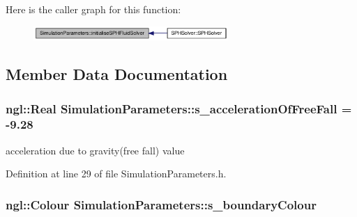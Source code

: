 Here is the caller graph for this function:\nopagebreak
\begin{figure}[H]
\begin{center}
\leavevmode
\includegraphics[width=209pt]{class_simulation_parameters_aa9389962f767734ad8f0ffc63cb0ed46_icgraph}
\end{center}
\end{figure}




\subsection{Member Data Documentation}
\hypertarget{class_simulation_parameters_a7e0162b56c6960d1aceb3a88ee3326e3}{
\subsubsection[{s\_\-accelerationOfFreeFall}]{\setlength{\rightskip}{0pt plus 5cm}ngl::Real {\bf SimulationParameters::s\_\-accelerationOfFreeFall} = -\/9.28}}
\label{class_simulation_parameters_a7e0162b56c6960d1aceb3a88ee3326e3}


acceleration due to gravity(free fall) value 



Definition at line 29 of file SimulationParameters.h.

\hypertarget{class_simulation_parameters_a8dcb13bd6eaf80cbc5cc06de425d4024}{
\subsubsection[{s\_\-boundaryColour}]{\setlength{\rightskip}{0pt plus 5cm}ngl::Colour {\bf SimulationParameters::s\_\-boundaryColour}}}
\label{class_simulation_parameters_a8dcb13bd6eaf80cbc5cc06de425d4024}


